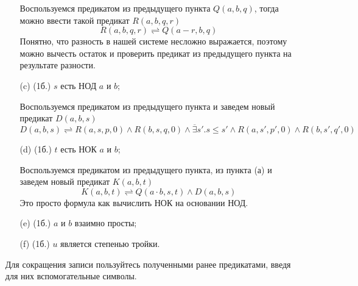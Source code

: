 \begin{enumerate}
\begin{itemize}
        \begin{solution}
            Воспользуемся предикатом из предыдущего пункта $Q(a,b,q)$, тогда можно ввести такой предикат $R(a,b,q,r)$
            \begin{equation}
                R(a,b,q,r) \rightleftharpoons Q(a - r,b,q)
            \end{equation}
            Понятно, что разность в нашей системе несложно выражается, поэтому можно вычесть остаток и проверить предикат из предыдущего пункта на результате разности.
        \end{solution}
        \item[(c)] (1б.) $s$ есть НОД $a$ и $b$;
        \begin{solution}
            Воспользуемся предикатом из предыдущего пункта и заведем новый предикат $D(a,b,s)$
            \begin{equation}
                D(a,b,s) \rightleftharpoons R(a,s,p,0) \land R(b,s,q,0) \land \overline{\exists} s'. s \leq s' \land R(a,s',p',0) \land R(b,s',q',0)
            \end{equation}
        \end{solution}
        \item[(d)] (1б.) $t$ есть НОК $a$ и $b$;
        \begin{solution}
            Воспользуемся предикатом из предыдущего пункта, из пункта (а) и заведем новый предикат $K(a,b,t)$
            \begin{equation}
                K(a,b,t) \rightleftharpoons Q(a \cdot b,s,t) \land D(a,b,s)
            \end{equation}
            Это просто формула как вычислить НОК на основании НОД.
        \end{solution}
        \item[(e)] (1б.) $a$ и $b$ взаимно просты;
        \item[(f)] (1б.) $u$ является степенью тройки.
    \end{itemize}
    Для сокращения записи пользуйтесь полученными ранее предикатами, введя для них вспомогательные символы.
    
\end{enumerate}
\clearpage

